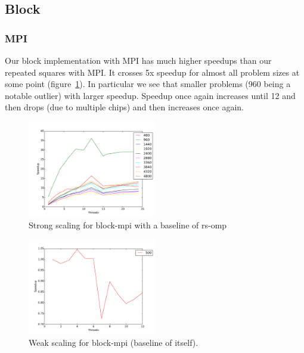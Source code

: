 \subsection{Block}

\subsubsection{MPI}

Our block implementation with MPI has much higher speedups than our repeated squares with MPI. It crosses 5x speedup for almost all problem sizes at some point (figure~\ref{strong-block-mpi}). In particular we see that smaller problems (960 being a notable outlier) with larger speedup. Speedup once again increases until 12 and then drops (due to multiple chips) and then increases once again.

\begin{figure}[ht]
\centering
\includegraphics[width=0.5\textwidth]{plots/strong_block-mpi_baseline-rs-omp--1.pdf}
\caption{Strong scaling for block-mpi with a baseline of rs-omp}
\label{strong-block-mpi}
\end{figure}


\begin{figure}[ht]
\centering
\includegraphics[width=0.5\textwidth]{plots/weak_block-mpi.pdf}
\caption{Weak scaling for block-mpi (baseline of itself).}
\label{weak-block-mpi}
\end{figure}

